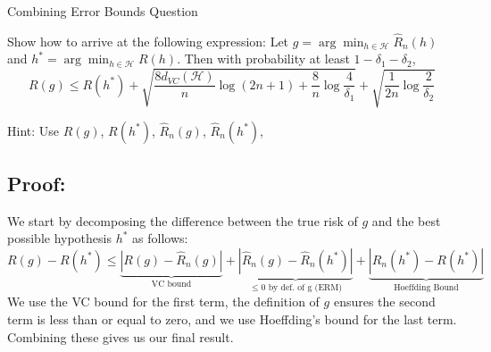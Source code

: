 \begin{examplebox}{Combining Error Bounds Question}
    
Show how to arrive at the following expression:
Let \( g = \arg\min_{h\in\mathcal{H}} \widehat{R}_n(h) \) and \( h^* = \arg\min_{h\in\mathcal{H}} R(h) \). Then with probability at least \( 1 - \delta_1 - \delta_2 \),
\[
R(g) \leq R(h^*) + \sqrt{\frac{8d_{VC}(\mathcal{H})}{n} \log(2n + 1) + \frac{8}{n} \log \frac{4}{\delta_1} } + \sqrt{\frac{1}{2n} \log \frac{2}{\delta_2}}
\]

Hint: Use \( R(g) \), \( R(h^*) \), \( \widehat{R}_n(g) \), \( \widehat{R}_n(h^*) \),

\subsection*{Proof:}
We start by decomposing the difference between the true risk of \( g \) and the best possible hypothesis \( h^* \) as follows:
\[
R(g) - R(h^*) \leq \underbrace{|R(g) - \widehat{R}_n(g)|}_{\text{VC bound}} + \underbrace{|\widehat{R}_n(g) - \widehat{R}_n(h^*)|}_{\leq 0 \text{ by def. of g (ERM)}} + \underbrace{|\widehat{R}_n(h^*) - R(h^*)|}_{\text{Hoeffding Bound}}
\]
We use the VC bound for the first term, the definition of \( g \) ensures the second term is less than or equal to zero, and we use Hoeffding's bound for the last term. Combining these gives us our final result.

\end{examplebox}

